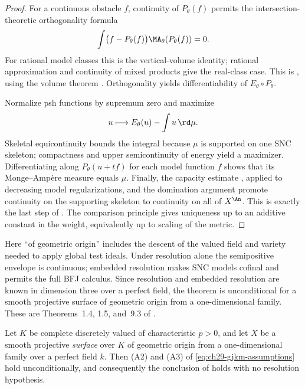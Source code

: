 \begin{proof}
For a continuous obstacle $f$, continuity of $P_\theta(f)$ permits the
intersection-theoretic orthogonality formula
\[
 \int\bigl(f-P_\theta(f)\bigr)
        \MA_\theta(P_\theta(f))=0.
\]
For rational model classes this is the vertical-volume identity; rational
approximation and continuity of mixed products give the real-class case.
This is \cite[Theorem~9.2]{GJKM19}, using the volume theorem
\cite[Theorem~6.3.2]{BGGJKM20}.  Orthogonality yields differentiability of
$E_\theta\circ P_\theta$.

Normalize psh functions by supremum zero and maximize
\[
                  u\longmapsto E_\theta(u)-\int u\,\rd\mu.
\]
Skeletal equicontinuity bounds the integral because $\mu$ is supported on
one SNC skeleton; compactness and upper semicontinuity of energy yield a
maximizer.  Differentiating along
$P_\theta(u+tf)$ for each model function $f$ shows that its Monge--Amp\`ere
measure equals $\mu$.  Finally, the capacity estimate
, applied to decreasing model
regularizations, and the domination argument
 promote continuity on the supporting
skeleton to continuity on all of $X^{\An}$.  This is exactly the last step
of \cite[Theorem~9.3]{GJKM19}.  The comparison principle gives uniqueness
up to an additive constant in the weight, equivalently up to scaling of the
metric.
\end{proof}

Here ``of geometric origin'' includes the descent of the valued field and
variety needed to apply global test ideals.  Under resolution alone the
semipositive envelope is continuous; embedded resolution makes SNC models
cofinal and permits the full BFJ calculus.  Since resolution and embedded
resolution are known in dimension three over a perfect field, the theorem
is unconditional for a smooth projective surface of geometric origin from a
one-dimensional family.  These are Theorems~1.4, 1.5, and~9.3 of
\cite{GJKM19}.

\begin{corollary}
\label{cor:ch29-gjkm-surface-cy}
Let \(K\) be complete discretely valued of characteristic \(p>0\), and let
\(X\) be a smooth projective \emph{surface} over \(K\) of geometric origin
from a one-dimensional family over a perfect field \(k\).  Then
\textup{(A2)} and \textup{(A3)} of \eqref{eq:ch29-gjkm-assumptions} hold
unconditionally, and consequently the conclusion of
 holds with no resolution
hypothesis.
\end{corollary}

